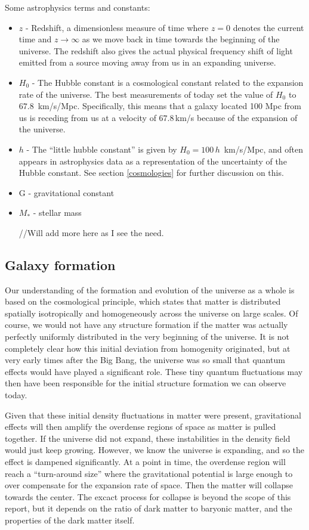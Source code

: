 Some astrophysics terms and constants:

\begin{itemize}
    \item $z$ - Redshift, a dimensionless measure of time where $z=0$ denotes the current time and $z \rightarrow \infty$ as we move back in time towards the beginning of the universe. The redshift also gives the actual physical frequency shift of light emitted from a source moving away from us in an expanding universe.
    \item $H_{0}$ - The Hubble constant is a cosmological constant related to the expansion rate of the universe. The best measurements of today set the value of $H_0$ to $67.8\, $ km/s/Mpc. Specifically, this means that a galaxy located 100 Mpc from us is receding from us at a velocity of $67.8\,$km/s because of the expansion of the universe.
    \item $h$ - The ``little hubble constant'' is given by $H_0 = 100\,h\,$ km/s/Mpc, and often appears in astrophysics data as a representation of the uncertainty of the Hubble constant. See section \ref{cosmologies} for further discussion on this.
    \item G - gravitational constant
    \item $M_{*}$ - stellar mass
    
//Will add more here as I see the need.

\end{itemize}

\subsection{Galaxy formation}

Our understanding of the formation and evolution of the universe as a whole is based on the cosmological principle, which states that matter is distributed spatially isotropically and homogeneously across the universe on large scales. Of course, we would not have any structure formation if the matter was actually perfectly uniformly distributed in the very beginning of the universe. It is not completely clear how this initial deviation from homogenity originated, but at very early times after the Big Bang, the universe was so small that quantum effects would have played a significant role. These tiny quantum fluctuations may then have been responsible for the initial structure formation we can observe today.

Given that these initial density fluctuations in matter were present, gravitational effects will then amplify the overdense regions of space as matter is pulled together. If the universe did not expand, these instabilities in the density field would just keep growing. However, we know the universe is expanding, and so the effect is dampened significantly. At a point in time, the overdense region will reach a ``turn-around size'' where the gravitational potential is large enough to over compensate for the expansion rate of space. Then the matter will collapse towards the center. The excact process for collapse is beyond the scope of this report, but it depends on the ratio of dark matter to baryonic matter, and the properties of the dark matter itself. 

